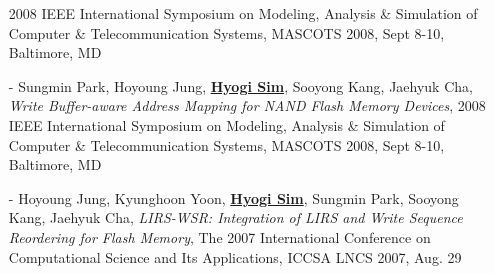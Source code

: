 \begin{itemize}[leftmargin=*]
 2008 IEEE International Symposium on Modeling, Analysis \& Simulation of
 Computer \& Telecommunication Systems, MASCOTS 2008, Sept 8-10, Baltimore, MD
\item[-] Sungmin Park, Hoyoung Jung, \underline{\bf Hyogi Sim}, Sooyong Kang, Jaehyuk Cha,
 {\it Write Buffer-aware Address Mapping for NAND Flash Memory Devices},
 2008 IEEE International Symposium on Modeling, Analysis \& Simulation of
 Computer \& Telecommunication Systems, MASCOTS 2008, Sept 8-10, Baltimore, MD
\item[-] Hoyoung Jung, Kyunghoon Yoon, \underline{\bf Hyogi Sim},
 Sungmin Park, Sooyong Kang, Jaehyuk Cha,
 {\it LIRS-WSR: Integration of LIRS and Write Sequence Reordering for Flash
 Memory},
 The 2007 International Conference on Computational Science and Its
 Applications, ICCSA LNCS 2007, Aug. 29
\end{itemize}

